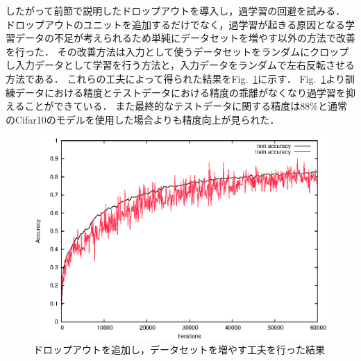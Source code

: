 \documentclass[a4paper,10pt]{jsarticle}
\begin{document}
したがって前節で説明したドロップアウトを導入し，過学習の回避を試みる．
ドロップアウトのユニットを追加するだけでなく，過学習が起きる原因となる学習データの不足が考えられるため単純にデータセットを増やす以外の方法で改善を行った．
その改善方法は入力として使うデータセットをランダムにクロップし入力データとして学習を行う方法と，入力データをランダムで左右反転させる方法である．
これらの工夫によって得られた結果をFig.~\ref{fig:ドロップアウトを追加し，データセットを増やす工夫を行った結果}に示す．
Fig.~\ref{fig:ドロップアウトを追加し，データセットを増やす工夫を行った結果}より訓練データにおける精度とテストデータにおける精度の乖離がなくなり過学習を抑えることができている．
また最終的なテストデータに関する精度は$88\%$と通常のCifar10のモデルを使用した場合よりも精度向上が見られた．

\begin{figure}[tb]
  \begin{center}
    \includegraphics[clip,width=12cm]{./fig/eps/dropout.eps}
  \end{center}
  \caption{ドロップアウトを追加し，データセットを増やす工夫を行った結果}
  \label{fig:ドロップアウトを追加し，データセットを増やす工夫を行った結果}
\end{figure}

\end{document}

